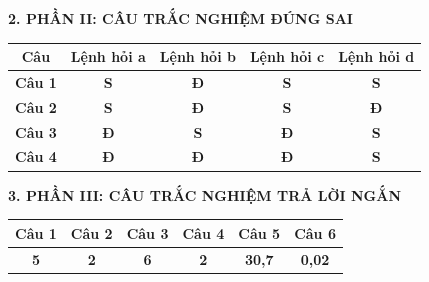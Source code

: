\documentclass[11pt,a4paper]{article}
\begin{document}
\vspace{0.3cm}
\noindent\textbf{\large 2. PHẦN II: CÂU TRẮC NGHIỆM ĐÚNG SAI}\\
\begin{center}
\renewcommand{\arraystretch}{1.2}
\begin{tabular}{|c|c|c|c|c|}
\hline
\textbf{Câu} & \textbf{Lệnh hỏi a} & \textbf{Lệnh hỏi b} & \textbf{Lệnh hỏi c} & \textbf{Lệnh hỏi d} \\
\hline
\textbf{Câu 1} & \textbf{\color{hfRed}S} & \textbf{\color{hfRed}Đ} & \textbf{\color{hfRed}S} & \textbf{\color{hfRed}S} \\
\hline
\textbf{Câu 2} & \textbf{\color{hfRed}S} & \textbf{\color{hfRed}Đ} & \textbf{\color{hfRed}S} & \textbf{\color{hfRed}Đ} \\
\hline
\textbf{Câu 3} & \textbf{\color{hfRed}Đ} & \textbf{\color{hfRed}S} & \textbf{\color{hfRed}Đ} & \textbf{\color{hfRed}S} \\
\hline
\textbf{Câu 4} & \textbf{\color{hfRed}Đ} & \textbf{\color{hfRed}Đ} & \textbf{\color{hfRed}Đ} & \textbf{\color{hfRed}S} \\
\hline
\end{tabular}
\end{center}

\vspace{0.3cm}
\noindent\textbf{\large 3. PHẦN III: CÂU TRẮC NGHIỆM TRẢ LỜI NGẮN}\\
\begin{center}
\renewcommand{\arraystretch}{1.2}
\begin{tabular}{|c|c|c|c|c|c|}
\hline
\textbf{Câu 1} & \textbf{Câu 2} & \textbf{Câu 3} & \textbf{Câu 4} & \textbf{Câu 5} & \textbf{Câu 6} \\
\hline
\textbf{\color{hfRed}5} & \textbf{\color{hfRed}2} & \textbf{\color{hfRed}6} & \textbf{\color{hfRed}2} & \textbf{\color{hfRed}30,7} & \textbf{\color{hfRed}0,02} \\
\hline
\end{tabular}
\end{center}
\end{document}

